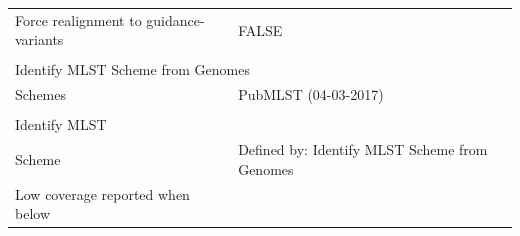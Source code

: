 \begin{longtable}{ll}
Force realignment to guidance-variants       & FALSE                                          \\
                                             &                                                \\
\multicolumn{2}{l}{Identify MLST Scheme from Genomes}                                         \\
Schemes                                      & PubMLST (04-03-2017)                           \\
                                             &                                                \\
Identify MLST                                &                                                \\
Scheme                                       & Defined by: Identify MLST Scheme from Genomes  \\
Low coverage reported when below             &                                               
\end{longtable}